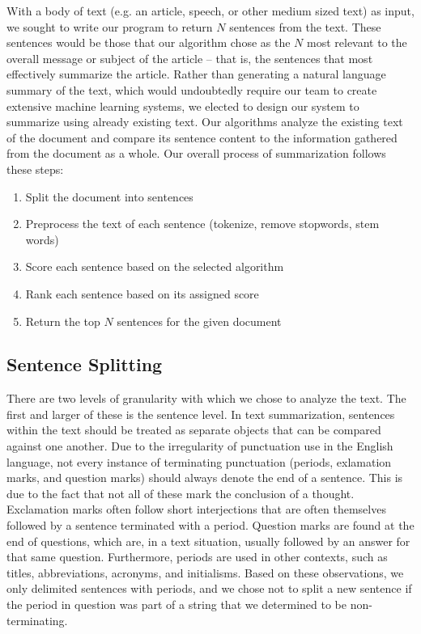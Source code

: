 \documentclass[11pt,a4paper]{article}
\begin{document}
With a body of text (e.g. an article, speech, or other medium sized text) as input, we sought to write our program to return $N$ sentences from the text. These sentences would be those that our algorithm chose as the $N$ most relevant to the overall message or subject of the article – that is, the sentences that most effectively summarize the article. Rather than generating a natural language summary of the text, which would undoubtedly require our team to create extensive machine learning systems, we elected to design our system to summarize using already existing text. Our algorithms analyze the existing text of the document and compare its sentence content to the information gathered from the document as a whole. Our overall process of summarization follows these steps:
\begin{enumerate}
  \item Split the document into sentences
    \item Preprocess the text of each sentence (tokenize, remove stopwords, stem words)
    \item Score each sentence based on the selected algorithm
    \item Rank each sentence based on its assigned score
    \item Return the top $N$ sentences for the given document
\end{enumerate}

\subsection{Sentence Splitting}

There are two levels of granularity with which we chose to analyze the text. The first and larger of these is the sentence level. In text summarization, sentences within the text should be treated as separate objects that can be compared against one another. Due to the irregularity of punctuation use in the English language, not every instance of terminating punctuation (periods, exlamation marks, and question marks) should always denote the end of a sentence. This is due to the fact that not all of these mark the conclusion of a thought. Exclamation marks often follow short interjections that are often themselves followed by a sentence terminated with a period. Question marks are found at the end of questions, which are, in a text situation, usually followed by an answer for that same question. Furthermore, periods are used in other contexts, such as titles, abbreviations, acronyms, and initialisms. Based on these observations, we only delimited sentences with periods, and we chose not to split a new sentence if the period in question was part of a string that we determined to be non-terminating.
\end{document}
